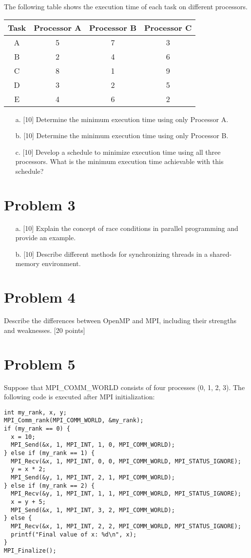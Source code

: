\documentclass{article}
\begin{document}
The following table shows the execution time of each task on different processors.

\begin{tabular}{cccc}
\toprule
Task & Processor A & Processor B & Processor C \\
\midrule
A & 5 & 7 & 3 \\
B & 2 & 4 & 6 \\
C & 8 & 1 & 9 \\
D & 3 & 2 & 5 \\
E & 4 & 6 & 2 \\
\bottomrule
\end{tabular}

\begin{enumerate}
    \item[a.] [10]  Determine the minimum execution time using only Processor A.
    \item[b.] [10] Determine the minimum execution time using only Processor B.
    \item[c.] [10]  Develop a schedule to minimize execution time using all three processors. What is the minimum execution time achievable with this schedule?
\end{enumerate}


\section*{Problem 3}
\begin{enumerate}
    \item[a.] [10] Explain the concept of race conditions in parallel programming and provide an example.
    \item[b.] [10] Describe different methods for synchronizing threads in a shared-memory environment.
\end{enumerate}


\section*{Problem 4}
Describe the differences between OpenMP and MPI, including their strengths and weaknesses.  [20 points]

\section*{Problem 5}
Suppose that MPI\_COMM\_WORLD consists of four processes (0, 1, 2, 3). The following code is executed after MPI initialization:

\begin{verbatim}
int my_rank, x, y;
MPI_Comm_rank(MPI_COMM_WORLD, &my_rank);
if (my_rank == 0) {
  x = 10;
  MPI_Send(&x, 1, MPI_INT, 1, 0, MPI_COMM_WORLD);
} else if (my_rank == 1) {
  MPI_Recv(&x, 1, MPI_INT, 0, 0, MPI_COMM_WORLD, MPI_STATUS_IGNORE);
  y = x * 2;
  MPI_Send(&y, 1, MPI_INT, 2, 1, MPI_COMM_WORLD);
} else if (my_rank == 2) {
  MPI_Recv(&y, 1, MPI_INT, 1, 1, MPI_COMM_WORLD, MPI_STATUS_IGNORE);
  x = y + 5;
  MPI_Send(&x, 1, MPI_INT, 3, 2, MPI_COMM_WORLD);
} else {
  MPI_Recv(&x, 1, MPI_INT, 2, 2, MPI_COMM_WORLD, MPI_STATUS_IGNORE);
  printf("Final value of x: %d\n", x);
}
MPI_Finalize();
\end{verbatim}
\end{document}
